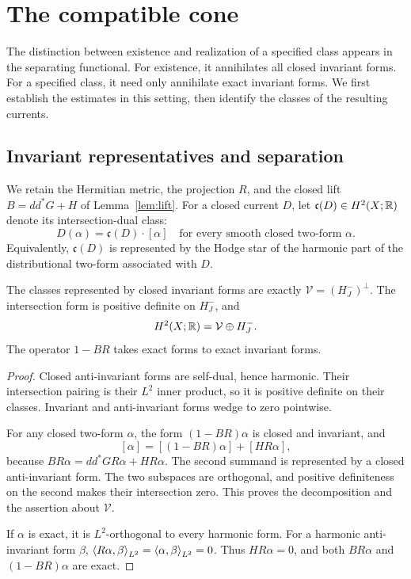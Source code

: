 \section{The compatible cone}\label{sec:cones}

The distinction between existence and realization of a specified class
appears in the separating functional. For existence, it annihilates all
closed invariant forms. For a specified class, it need only annihilate
exact invariant forms. We first establish the estimates in this setting,
then identify the classes of the resulting currents.

\subsection{Invariant representatives and separation}

We retain the Hermitian metric, the projection \(R\), and the closed
lift \(B=dd^*G+H\) of Lemma~\ref{lem:lift}.
For a closed current \(D\), let
\(\mathfrak c(D)\in H^2(X;\mathbb R)\) denote its intersection-dual class:
\[
 D(\alpha)=\mathfrak c(D)\cdot[\alpha]
 \quad\text{for every smooth closed two-form }\alpha.
\]
Equivalently, \(\mathfrak c(D)\) is represented by the Hodge star of
the harmonic part of the distributional two-form associated with \(D\).

\begin{lemma}\label{lem:invariant-cohomology}
The classes represented by closed invariant forms are exactly
\(\mathcal V=(H_J^-)^\perp\). The intersection form is positive
definite on \(H_J^-\), and
\[
 H^2(X;\mathbb R)=\mathcal V\oplus H_J^-.
\]
The operator \(1-BR\) takes exact forms to exact invariant forms.
\end{lemma}

\begin{proof}
Closed anti-invariant forms are self-dual, hence harmonic. Their
intersection pairing is their \(L^2\) inner product, so it is positive
definite on their classes. Invariant and anti-invariant forms wedge to
zero pointwise.

For any closed two-form \(\alpha\), the form
\((1-BR)\alpha\) is closed and invariant, and
\[
 [\alpha]=[(1-BR)\alpha]+[HR\alpha],
\]
because \(BR\alpha=dd^*GR\alpha+HR\alpha\). The second summand
is represented by a closed anti-invariant form. The two subspaces are
orthogonal, and positive definiteness on the second makes their
intersection zero. This proves the decomposition and the assertion
about \(\mathcal V\).

If \(\alpha\) is exact, it is \(L^2\)-orthogonal to every harmonic
form. For a harmonic anti-invariant form \(\beta\),
\(\left\langle R\alpha,\beta\right\rangle_{L^2}=\left\langle \alpha,\beta\right\rangle_{L^2}=0\).
Thus \(HR\alpha=0\), and both \(BR\alpha\) and
\((1-BR)\alpha\) are exact.
\end{proof}

